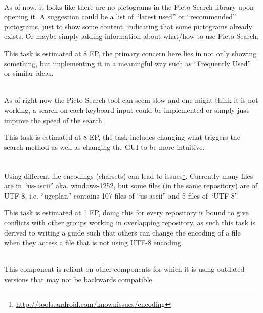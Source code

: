 \begin{description}[style=unboxed]
    \item[{[}\phigh{]} Picto Search --- It looks like there are no pictograms, until you search for them] \hfill \\
        As of now, it looks like there are no pictograms in the Picto Search library upon opening it.
        A suggestion could be a list of \enquote{latest used} or \enquote{recommended} pictograms, just to show some content, indicating that some pictograms already exists.
        Or maybe simply adding information about what/how to use Picto Search.

        This task is estimated at 8 EP, the primary concern here lies in not only showing something, but implementing it in a meaningful way such as \enquote{Frequently Used} or similar ideas.
    \item[{[}\phigh{]} Picto Search --- Responsive Search] \hfill \\
        As of right now the Picto Search tool can seem slow and one might think it is not working, a search on each keyboard input could be implemented or simply just improve the speed of the search.

        This task is estimated at 8 EP, the task includes changing what triggers the search method as well as changing the GUI to be more intuitive.
    \item[{[}\phigh{]} General --- Use consistent file encoding] \hfill \\
        Using different file encodings (charsets) can lead to issues\footnote{\url{http://tools.android.com/knownissues/encoding}}.
        Currently many files are in \enquote{us-ascii} aka. windows-1252, but some files (in the same repository) are of UTF-8, i.e. \enquote{ugeplan} contains 107 files of \enquote{us-ascii} and 5 files of \enquote{UTF-8}.

        This task is estimated at 1 EP, doing this for every repository is bound to give conflicts with other groups working in overlapping repository, as such this task is derived to writing a guide such that others can change the encoding of a file when they access a file that is not using UTF-8 encoding.
    \item[{[}\phigh{]} SequenceViewer --- Update dependencies] \hfill \\
        This component is reliant on other components for which it is using outdated versions that may not be backwards compatible.


\end{description}
